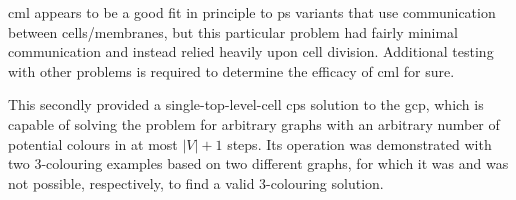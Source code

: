 \Gls{cml} appears to be a good fit in principle to \gls{ps} variants that use communication between cells/membranes, but this particular problem had fairly minimal communication and instead relied heavily upon cell division.  Additional testing with other problems is required to determine the efficacy of \gls{cml} for sure.

This  secondly provided a single-top-level-cell \gls{cps} solution to the \gls{gcp}, which is capable of solving the problem for arbitrary graphs with an arbitrary number of potential colours in at most \(|V| + 1\) steps.  Its operation was demonstrated with two 3-colouring examples based on two different graphs, for which it was and was not possible, respectively, to find a valid 3-colouring solution.
